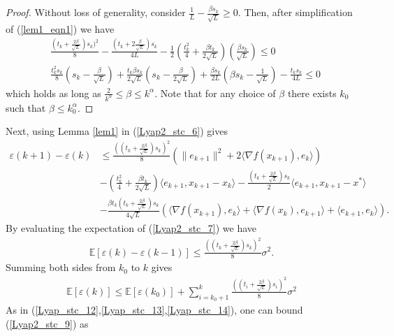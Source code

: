 \documentclass{article}
\theoremstyle{plain}
\theoremstyle{definition}
\theoremstyle{remark}
\begin{document}
        \begin{proof}\label{lem1_proof}
            Without loss of generality, consider $\frac{1}{L}-\frac{\beta s_k}{\sqrt{L}}\geq 0$. Then, after simplification of (\ref{lem1_eqn1}) we have
            \begin{align}\label{lem1_eqn2}
                &\frac{(t_k+\frac{2\beta}{\sqrt{L}})s_k)^2}{8}- \frac{(t_k+2\frac{\beta}{\sqrt{L}})s_k}{4L}-\frac{1}{2}\left(\frac{t_k^2}{4}+\frac{\beta t_k}{2\sqrt{L}} \right)(\frac{\beta s_k}{\sqrt{L}})\leq 0\nonumber\\
                & \frac{t_k^2s_k}{8}(s_k-\frac{\beta}{\sqrt{L}})+\frac{t_k \beta s_k}{2\sqrt{L}}(s_k-\frac{\beta}{2\sqrt{L}})+\frac{\beta s_k}{2 L}(\beta s_k-\frac{1}{\sqrt{L}})-\frac{t_k s_k}{4L}\leq 0
            \end{align}
            which holds as long as $\frac{2}{k^{\alpha}}\leq \beta \leq k^{\alpha}$. Note that for any choice of $\beta$ there exists $k_0$ such that $\beta\leq k_0^{\alpha}$.
        \end{proof}
Next, using Lemma \ref{lem1} in (\ref{Lyap2_stc_6}) gives 
\begin{align}\label{Lyap2_stc_7}
    \varepsilon(k+1)-\varepsilon(k)&\leq \frac{((t_k+\frac{2\beta}{\sqrt{L}})s_k)^2}{8}(\|e_{k+1}\|^2+2\langle \nabla f(x_{k+1}) ,e_k \rangle)\nonumber\\
         & -(\frac{t_k^2}{4}+\frac{\beta t_k}{2\sqrt{L}})\langle e_{k+1},x_{k+1}-x_k\rangle-\frac{(t_k+\tfrac{2\beta}{\sqrt{L}})s_k}{2}\langle e_{k+1},x_{k+1}-x^*\rangle\nonumber\\
         &-\frac{\beta t_k(t_k+\frac{2\beta}{\sqrt{L}})s_k}{4\sqrt{L}}\left(\langle \nabla f(x_{k+1}),e_k \rangle+\langle \nabla f(x_{k}) , e_{k+1}\rangle+\langle e_{k+1},e_k\rangle\right).
\end{align}
    By evaluating the expectation of (\ref{Lyap2_stc_7}) we have
    \begin{align}\label{Lyap2_stc_8}
        \mathbb{E}\left[\varepsilon(k)-\varepsilon(k-1)\right]\leq \frac{((t_k+\frac{2\beta}{\sqrt{L}})s_k)^2}{8}\sigma^2.
    \end{align}
    Summing both sides from $k_0$ to $k$ gives
    \begin{align}\label{Lyap2_stc_9}
        \mathbb E[\varepsilon(k)]\leq \mathbb E[\varepsilon(k_0)]+\sum_{i=k_0+1}^{k}\frac{((t_i+\frac{2\beta}{\sqrt{L}})s_i)^2}{8}\sigma^2
    \end{align}
    As in (\ref{Lyap_stc_12},\ref{Lyap_stc_13},\ref{Lyap_stc_14}), one can bound (\ref{Lyap2_stc_9}) as
\end{document}
